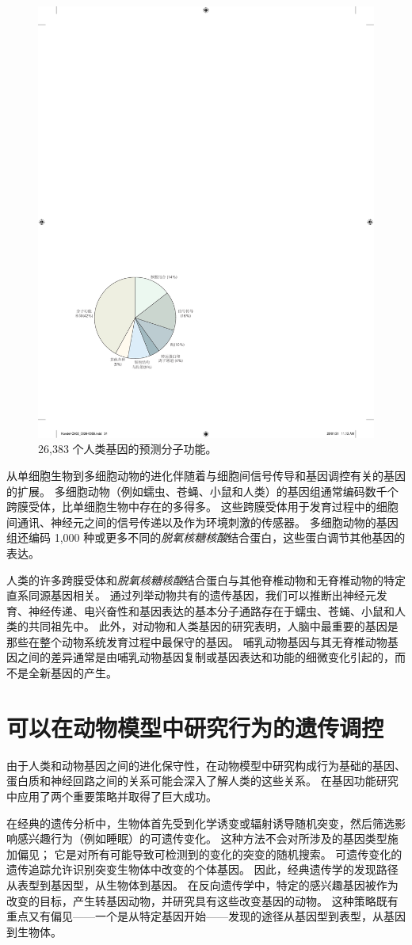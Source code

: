 \begin{figure}[htbp]
	\centering
	\includegraphics[width=0.5\linewidth]{chap02/fig_2_6}
	\caption{26,383 个人类基因的预测分子功能\cite{venter2001sequence}。}
	\label{fig:2_6}
\end{figure}


从单细胞生物到多细胞动物的进化伴随着与细胞间信号传导和基因调控有关的基因的扩展。
多细胞动物（例如蠕虫、苍蝇、小鼠和人类）的基因组通常编码数千个跨膜受体，比单细胞生物中存在的多得多。 
这些跨膜受体用于发育过程中的细胞间通讯、神经元之间的信号传递以及作为环境刺激的传感器。
多细胞动物的基因组还编码 1,000 种或更多不同的\textit{脱氧核糖核酸}结合蛋白，这些蛋白调节其他基因的表达。


人类的许多跨膜受体和\textit{脱氧核糖核酸}结合蛋白与其他脊椎动物和无脊椎动物的特定直系同源基因相关。
通过列举动物共有的遗传基因，我们可以推断出神经元发育、神经传递、电兴奋性和基因表达的基本分子通路存在于蠕虫、苍蝇、小鼠和人类的共同祖先中。
此外，对动物和人类基因的研究表明，人脑中最重要的基因是那些在整个动物系统发育过程中最保守的基因。
哺乳动物基因与其无脊椎动物基因之间的差异通常是由哺乳动物基因复制或基因表达和功能的细微变化引起的，而不是全新基因的产生。



\section{可以在动物模型中研究行为的遗传调控}

由于人类和动物基因之间的进化保守性，在动物模型中研究构成行为基础的基因、蛋白质和神经回路之间的关系可能会深入了解人类的这些关系。
在基因功能研究中应用了两个重要策略并取得了巨大成功。


在经典的遗传分析中，生物体首先受到化学诱变或辐射诱导随机突变，然后筛选影响感兴趣行为（例如睡眠）的可遗传变化。
这种方法不会对所涉及的基因类型施加偏见；
它是对所有可能导致可检测到的变化的突变的随机搜索。 
可遗传变化的遗传追踪允许识别突变生物体中改变的个体基因。
因此，经典遗传学的发现路径从表型到基因型，从生物体到基因。
在反向遗传学中，特定的感兴趣基因被作为改变的目标，产生转基因动物，并研究具有这些改变基因的动物。
这种策略既有重点又有偏见——一个是从特定基因开始——发现的途径从基因型到表型，从基因到生物体。


